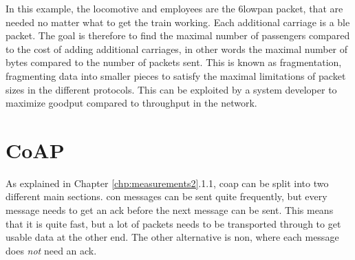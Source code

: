\noindent In this example, the locomotive and employees are the \gls{6lowpan} packet, that are needed no matter what to get the train working. Each additional carriage is a \gls{ble} packet. The goal is therefore to find the maximal number of passengers compared to the cost of adding additional carriages, in other words the maximal number of bytes compared to the number of packets sent. This is known as fragmentation, fragmenting data into smaller pieces to satisfy the maximal limitations of packet sizes in the different protocols. This can be exploited by a system developer to maximize \gls{goodput} compared to \gls{throughput} in the network.
 


\section{CoAP}

\noindent As explained in Chapter \ref{chp:measurements2}.1.1, \gls{coap} can be split into two different main sections. \gls{con} messages can be sent quite frequently, but every message needs to get an \gls{ack} before the next message can be sent. This means that it is quite fast, but a lot of packets needs to be transported through to get usable data at the other end. The other alternative is \gls{non}, where each message does \textit{not} need an \gls{ack}. 






